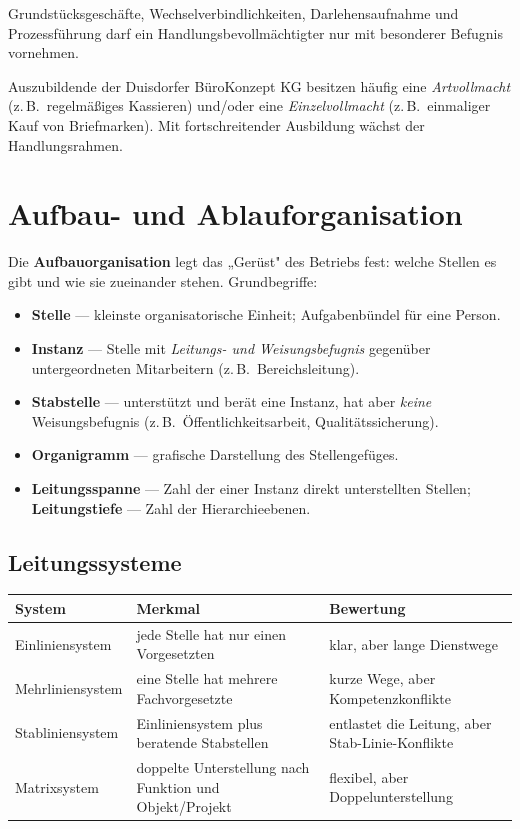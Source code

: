 \documentclass[11pt, a4paper]{article}
\begin{document}
Grundstücksgeschäfte, Wechselverbindlichkeiten, Darlehensaufnahme und Prozessführung
darf ein Handlungsbevollmächtigter nur mit besonderer Befugnis vornehmen.

\begin{beispiel}
Auszubildende der Duisdorfer BüroKonzept KG besitzen häufig eine \emph{Artvollmacht}
(z.\,B.\ regelmäßiges Kassieren) und/oder eine \emph{Einzelvollmacht} (z.\,B.\ einmaliger
Kauf von Briefmarken). Mit fortschreitender Ausbildung wächst der Handlungsrahmen.
\end{beispiel}

\section{Aufbau- und Ablauforganisation}

Die \textbf{Aufbauorganisation} legt das „Gerüst" des Betriebs fest: welche Stellen es
gibt und wie sie zueinander stehen. Grundbegriffe:

\begin{itemize}
  \item \textbf{Stelle} --- kleinste organisatorische Einheit; Aufgabenbündel für eine
    Person.
  \item \textbf{Instanz} --- Stelle mit \emph{Leitungs- und Weisungsbefugnis} gegenüber
    untergeordneten Mitarbeitern (z.\,B.\ Bereichsleitung).
  \item \textbf{Stabstelle} --- unterstützt und berät eine Instanz, hat aber \emph{keine}
    Weisungsbefugnis (z.\,B.\ Öffentlichkeitsarbeit, Qualitätssicherung).
  \item \textbf{Organigramm} --- grafische Darstellung des Stellengefüges.
  \item \textbf{Leitungsspanne} --- Zahl der einer Instanz direkt unterstellten Stellen;
    \textbf{Leitungstiefe} --- Zahl der Hierarchieebenen.
\end{itemize}

\subsection{Leitungssysteme}

\begin{center}
\begin{tabular}{p{2.8cm} p{5.1cm} p{4.6cm}}
\toprule
\textbf{System} & \textbf{Merkmal} & \textbf{Bewertung}\\
\midrule
Einliniensystem & jede Stelle hat nur einen Vorgesetzten & klar, aber lange Dienstwege\\
Mehrliniensystem & eine Stelle hat mehrere Fachvorgesetzte & kurze Wege, aber Kompetenzkonflikte\\
Stabliniensystem & Einliniensystem plus beratende Stabstellen & entlastet die Leitung, aber Stab-Linie-Konflikte\\
Matrixsystem & doppelte Unterstellung nach Funktion und Objekt/Projekt & flexibel, aber Doppelunterstellung\\
\bottomrule
\end{tabular}
\end{center}
\end{document}
